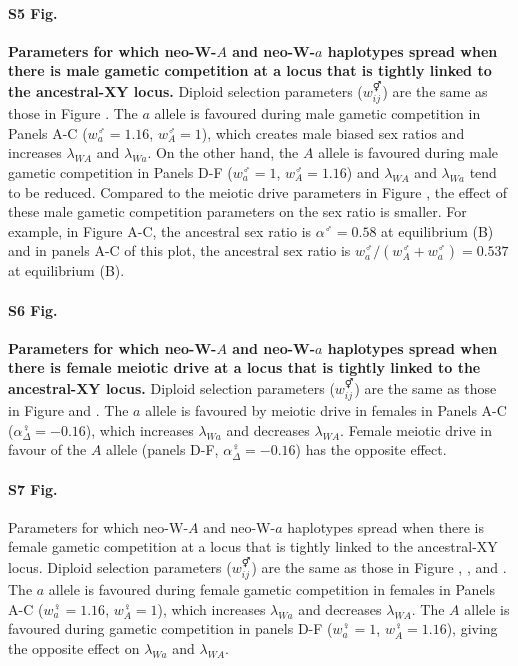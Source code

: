 \documentclass[10pt,letterpaper]{article}
\begin{document}
\paragraph*{S5 Fig.}
\label{fig:regionMaleGS}
{\bf Parameters for which neo-W-$A$ and neo-W-$a$ haplotypes spread when there is male gametic competition at a locus that is tightly linked to the ancestral-XY locus.}
Diploid selection parameters ($w_{ij}^\Hermaphrodite$) are the same as those in Figure . 
The $a$ allele is favoured during male gametic competition in Panels A-C ($w_{a}^\male=1.16$, $w_{A}^\male=1$), which creates male biased sex ratios and increases $\lambda_{WA}$ and $\lambda_{Wa}$. 
On the other hand, the $A$ allele is favoured during male gametic competition in Panels D-F ($w_{a}^\male=1$, $w_{A}^\male=1.16$) and $\lambda_{WA}$ and $\lambda_{Wa}$ tend to be reduced. 
Compared to the meiotic drive parameters in Figure , the effect of these male gametic competition parameters on the sex ratio is smaller. 
For example, in Figure A-C, the ancestral sex ratio is $\alpha^\male=0.58$ at equilibrium (B) and in panels A-C of this plot, the ancestral sex ratio is $w_{a}^\male/(w_{A}^\male+w_{a}^\male)=0.537$ at equilibrium (B). 

\paragraph*{S6 Fig.}
\label{fig:regionFemaleDrive}
{\bf Parameters for which neo-W-$A$ and neo-W-$a$ haplotypes spread when there is female meiotic drive at a locus that is tightly linked to the ancestral-XY locus.}
Diploid selection parameters ($w_{ij}^\Hermaphrodite$) are the same as those in Figure  and . 
The $a$ allele is favoured by meiotic drive in females in Panels A-C ($\alpha_{\Delta}^\female=-0.16$), which increases $\lambda_{Wa}$ and decreases $\lambda_{WA}$. 
Female meiotic drive in favour of the $A$ allele (panels D-F, $\alpha_{\Delta}^\female=-0.16$) has the opposite effect. 

\paragraph*{S7 Fig.}
\label{fig:regionFemaleGS}
Parameters for which neo-W-$A$ and neo-W-$a$ haplotypes spread when there is female gametic competition at a locus that is tightly linked to the ancestral-XY locus.
Diploid selection parameters ($w_{ij}^\Hermaphrodite$) are the same as those in Figure , , and . 
The $a$ allele is favoured during female gametic competition in females in Panels A-C ($w_{a}^\female=1.16$, $w_{A}^\female=1$), which increases $\lambda_{Wa}$ and decreases $\lambda_{WA}$. 
The $A$ allele is favoured during gametic competition in panels D-F ($w_{a}^\female=1$, $w_{A}^\female=1.16$), giving the opposite effect on $\lambda_{Wa}$ and $\lambda_{WA}$. 
\end{document}
